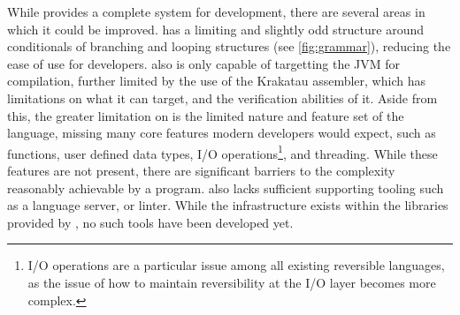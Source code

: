 While \rimp provides a complete system for development, there are several areas in which it could be improved. 
\rimp has a limiting and slightly odd structure around conditionals of branching and looping structures (see \ref{fig:grammar}), reducing the ease of use for developers. 
\rimp also is only capable of targetting the JVM for compilation, further limited by the use of the Krakatau assembler, which has limitations on what it can target, and the verification abilities of it.
Aside from this, the greater limitation on \rimp is the limited nature and feature set of the language, missing many core features modern developers would expect, such as functions, user defined data types, I/O operations\footnote{I/O operations are a particular issue among all existing reversible languages, as the issue of how to maintain reversibility at the I/O layer becomes more complex.}, and threading. While these features are not present, there are significant barriers to the complexity reasonably achievable by a \rimplang program. 
\rimp also lacks sufficient supporting tooling such as a language server, or linter. While the infrastructure exists within the libraries provided by \rimp, no such tools have been developed yet. 